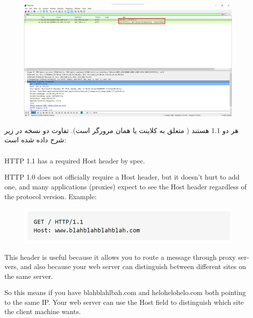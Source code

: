 \documentclass{article}
\begin{document}
\subsection{}
\begin{figure}[H]
    \centering
    \includegraphics[width=1.0\textwidth]{figures/31.jpg}
    \caption{}
    \label{fig:fig1}
\end{figure}
هر دو 1.1 هستند ( متعلق به کلاینت یا همان مرورگر است). تفاوت دو نسخه در زیر شرح داده شده است:
\subsubsection{}
\begin{latin}
HTTP 1.1 has a required Host header by spec.

HTTP 1.0 does not officially require a Host header, but it doesn't hurt to add one, and many applications (proxies) expect to see the Host header regardless of the protocol version.
Example:


\begin{figure}[H]
    \centering
    \includegraphics[width=1.0\textwidth]{figures/32.jpg}
    \caption{}
    \label{fig:fig1}
\end{figure}
This header is useful because it allows you to route a message through proxy servers, and also because your web server can distinguish between different sites on the same server.

So this means if you have blahblahlbah.com and helohelohelo.com both pointing to the same IP. Your web server can use the Host field to distinguish which site the client machine wants.
\end{latin}
\end{document}
